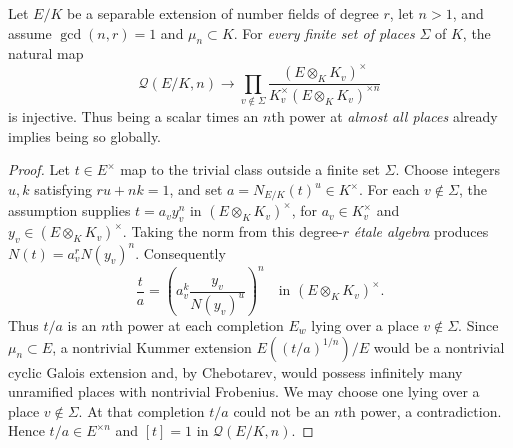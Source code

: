 \begin{proposition}\label{III:prop:global-power-hasse}
Let $E/K$ be a separable extension of number fields of degree $r$,
let $n>1$, and assume $\gcd(n,r)=1$ and $\mu_n\subset K$.
For \emph{every finite set of places} $\Sigma$ of $K$, the natural map
\begin{equation}\label{III:eq:power-local-inj}
 \mathcal Q(E/K,n)\longrightarrow
 \prod_{v\notin\Sigma}\frac{(E\otimes_K K_v)^\times}
 {K_v^\times (E\otimes_K K_v)^{\times n}}
\end{equation}
is injective. Thus being a scalar times an $n$th power at
\emph{almost all places} already implies being so globally.
\end{proposition}
\begin{proof}
Let $t\in E^\times$ map to the trivial class outside a finite set $\Sigma$.
Choose integers $u,k$ satisfying $ru+nk=1$, and set
$a=N_{E/K}(t)^u\in K^\times$.
For each $v\notin\Sigma$, the assumption supplies
$t=a_v y_v^n$ in $(E\otimes_K K_v)^\times$, for
$a_v\in K_v^\times$ and $y_v\in(E\otimes_K K_v)^\times$.
Taking the norm from this degree-$r$ \emph{\'{e}tale algebra}
produces $N(t)=a_v^r N(y_v)^n$. Consequently
\[
\frac{t}{a}=
\left(a_v^k\frac{y_v}{N(y_v)^u}\right)^n
\quad\text{in }(E\otimes_K K_v)^\times.
\]
Thus $t/a$ is an $n$th power at each completion $E_w$ lying over a place $v\notin\Sigma$.
Since $\mu_n\subset E$, a nontrivial Kummer extension
$E((t/a)^{1/n})/E$ would be a nontrivial cyclic Galois
extension and, by Chebotarev, would possess infinitely many unramified
places with nontrivial Frobenius. We may choose one lying over
a place $v\notin\Sigma$. At that completion $t/a$ could not
be an $n$th power, a contradiction. Hence
$t/a\in E^{\times n}$ and $[t]=1$ in $\mathcal Q(E/K,n)$.
\end{proof}

